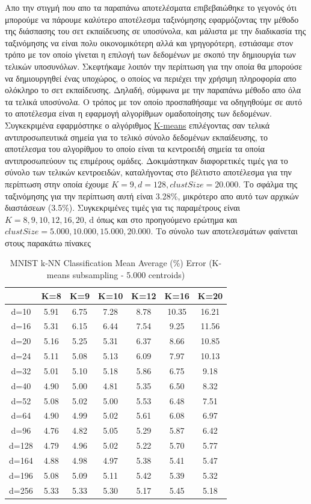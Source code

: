 \par
Απο την στιγμή που απο τα παραπάνω αποτελέσματα επιβεβαιώθηκε το γεγονός ότι μπορούμε να πάρουμε καλύτερο αποτέλεσμα ταξινόμησης εφαρμόζοντας την μέθοδο της διάσπασης του σετ εκπαίδευσης σε υποσύνολα, και μάλιστα με την διαδικασία της ταξινόμησης να είναι πολυ οικονομικότερη αλλά και γρηγορότερη, εστιάσαμε στον τρόπο με τον οποίο γίνεται η επιλογή των δεδομένων με σκοπό την δημιουργία των τελικών υποσυνόλων. Σκεφτήκαμε λοιπόν την περίπτωση για την οποία θα μπορούσε να δημιουργηθεί ένας υποχώρος, ο οποίος να περιέχει την χρήσιμη πληροφορία απο ολόκληρο το σετ εκπαίδευσης. Δηλαδή, σύμφωνα με την παραπάνω μέθοδο απο όλα τα τελικά υποσύνολα. Ο τρόπος με τον οποίο προσπαθήσαμε να οδηγηθούμε σε αυτό το αποτέλεσμα είναι η εφαρμογή αλγορίθμων ομαδοποίησης των δεδομένων. Συγκεκριμένα εφαρμόστηκε ο αλγόριθμος \href{https://en.wikipedia.org/wiki/K-means_clustering}{\textlatin{K-means}} επιλέγοντας σαν τελικά αντιπροσωπευτικά σημεία για το τελικό σύνολο δεδομένων εκπαίδευσης, το αποτέλεσμα του αλγορίθμου το οποίο είναι τα κεντροειδή σημεία τα οποία αντιπροσωπεύουν τις επιμέρους ομάδες. Δοκιμάστηκαν διαφορετικές τιμές για το σύνολο των τελικών κεντροειδών, καταλήγοντας στο βέλτιστο αποτέλεσμα για την περίπτωση στην οποία έχουμε $K=9, d=128, clustSize=20.000$. Το σφάλμα της ταξινόμησης για την περίπτωση αυτή είναι 3.28\%, μικρότερο απο αυτό των αρχικών διαστάσεων (3.5\%). Συγκεκριμένες τιμές για τις παραμέτρους είναι $K=8,9,10,12,16,20$, \textlatin{d} όπως και στο προηγούμενο ερώτημα και $clustSize=5.000, 10.000, 15.000, 20.000$. Το σύνολο των αποτελεσμάτων φαίνεται στους παρακάτω πίνακες
\begin{table}[H]
\centering
\label{tab:table4}
\begin{tabular}{|c|c|c|c|c|c|c|}
\hline
& K=8 & K=9 & K=10 & K=12 & K=16 & K=20 \\
\hline
d=10 & 5.91 & 6.75 & 7.28 & 8.78 & 10.35 & 16.21 \\
d=16 & 5.31 & 6.15 & 6.44 & 7.54 & 9.25 & 11.56 \\
d=20 & 5.16 & 5.25 & 5.31 & 6.37 & 8.66 & 10.85 \\
d=24 & 5.11 & 5.08 & 5.13 & 6.09 & 7.97 & 10.13 \\
d=32 & 5.01 & 5.10 & 5.18 & 5.86 & 6.75 & 9.18 \\
d=40 & 4.90 & 5.00 & 4.81 & 5.35 & 6.50 & 8.32 \\
d=52 & 5.08 & 5.02 & 5.00 & 5.53 & 6.48 & 7.51 \\
d=64 & 4.90 & 4.99 & 5.02 & 5.61 & 6.08 & 6.97 \\
d=96 & 4.76 & 4.82 & 5.05 & 5.29 & 5.87 & 6.42 \\
d=128 & 4.79 & 4.96 & 5.02 & 5.22 & 5.70 & 5.77 \\
d=164 & 4.88 & 4.98 & 4.97 & 5.38 & 5.41 & 5.47 \\
d=196 & 5.08 & 5.09 & 5.11 & 5.42 & 5.39 & 5.32 \\
d=256 & 5.33 & 5.33 & 5.30 & 5.17 & 5.45 & 5.18 \\
\hline
\end{tabular}
\caption{MNIST k-NN Classification Mean Average (\%) Error (K-means subsampling - 5.000 centroids)}
\end{table}

